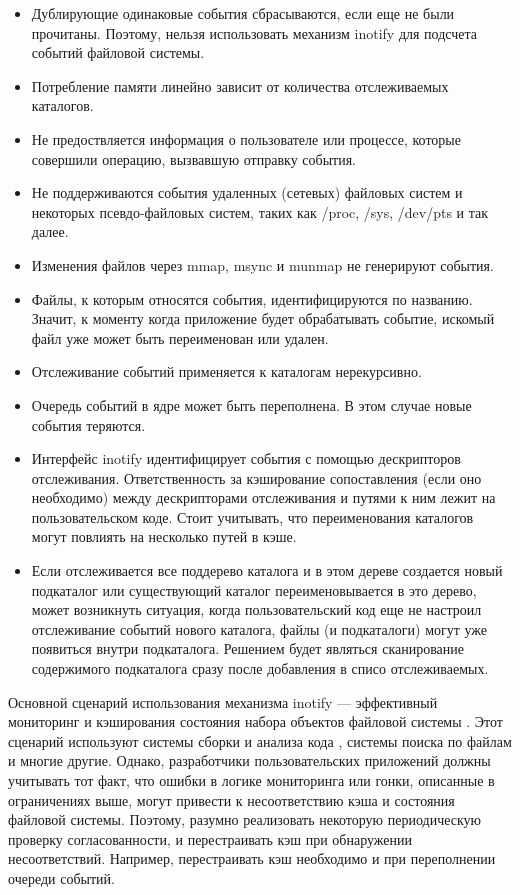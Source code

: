 \documentclass[14pt, russian]{scrartcl}
\begin{document}
\begin{itemize}
  \item Дублирующие одинаковые события сбрасываются, если еще не были прочитаны.
        Поэтому, нельзя использовать механизм inotify для подсчета событий
        файловой системы.
  \item Потребление памяти линейно зависит от количества отслеживаемых
        каталогов.
  \item Не предоствляется информация о пользователе или процессе, которые
        совершили операцию, вызвавшую отправку события.
  \item Не поддерживаются события удаленных (сетевых) файловых систем и
        некоторых псевдо-файловых систем, таких как /proc, /sys, /dev/pts и так
        далее.
  \item Изменения файлов через mmap, msync и munmap не генерируют события.
  \item Файлы, к которым относятся события, идентифицируются по названию.
        Значит, к моменту когда приложение будет обрабатывать событие, искомый
        файл уже может быть переименован или удален.
  \item Отслеживание событий применяется к каталогам нерекурсивно.
  \item Очередь событий в ядре может быть переполнена. В этом случае новые
        события теряются.
  \item Интерфейс inotify идентифицирует события с помощью дескрипторов
        отслеживания. Ответственность за кэширование сопоставления (если оно
        необходимо) между дескрипторами отслеживания и путями к ним лежит на
        пользовательском коде. Стоит учитывать, что переименования каталогов
        могут повлиять на несколько путей в кэше.
  \item Если отслеживается все поддерево каталога и в этом дереве создается
        новый подкаталог или существующий каталог переименовывается в это
        дерево, может возникнуть ситуация, когда пользовательский код еще не
        настроил отслеживание событий нового каталога, файлы (и подкаталоги)
        могут уже появиться внутри подкаталога. Решением будет являться
        сканирование содержимого подкаталога сразу после добавления в списо
        отслеживаемых.
\end{itemize}

Основной сценарий использования механизма inotify --- эффективный мониторинг и
кэширования состояния набора объектов файловой системы \cite{linuxmagazine}. Этот сценарий используют
системы сборки и анализа кода \cite{tup}, системы поиска по файлам и многие другие. Однако,
разработчики пользовательских приложений должны учитывать тот факт, что ошибки в
логике мониторинга или гонки, описанные в ограничениях выше, могут привести к
несоответствию кэша и состояния файловой системы. Поэтому, разумно реализовать
некоторую периодическую проверку согласованности, и перестраивать кэш при
обнаружении несоответствий. Например, перестраивать кэш необходимо и при
переполнении очереди событий.
\end{document}
